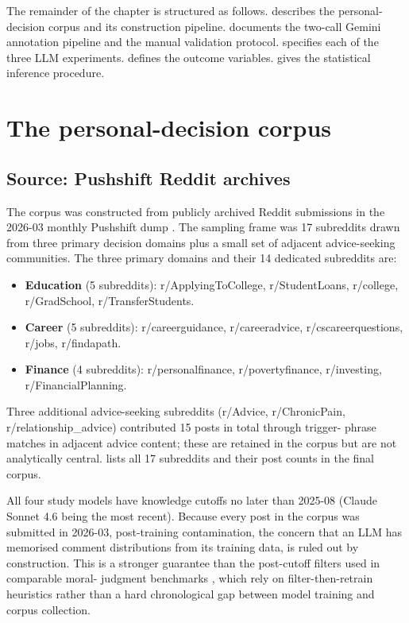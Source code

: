 The remainder of the chapter is structured as follows.
 describes the personal-decision corpus and its
construction pipeline.  documents the two-call
Gemini annotation pipeline and the manual validation protocol.
 specifies each of the three LLM experiments.
 defines the outcome variables. 
gives the statistical inference procedure.

\section{The personal-decision corpus}
\label{sec:m_corpus}

\subsection{Source: Pushshift Reddit archives}
\label{sec:m_source}

The corpus was constructed from publicly archived Reddit submissions in
the 2026-03 monthly Pushshift dump \citep{baumgartner-2020-pushshift}.
The sampling frame was 17 subreddits drawn from three primary decision
domains plus a small set of adjacent advice-seeking communities. The
three primary domains and their 14 dedicated subreddits are:

\begin{itemize}
\item \textbf{Education} (5 subreddits): r/ApplyingToCollege,
      r/StudentLoans, r/college, r/GradSchool, r/TransferStudents.
\item \textbf{Career} (5 subreddits): r/careerguidance,
      r/careeradvice, r/cscareerquestions, r/jobs, r/findapath.
\item \textbf{Finance} (4 subreddits): r/personalfinance,
      r/povertyfinance, r/investing, r/FinancialPlanning.
\end{itemize}

Three additional advice-seeking subreddits (r/Advice, r/ChronicPain,
r/relationship\_advice) contributed 15 posts in total through trigger-
phrase matches in adjacent advice content; these are retained in the
corpus but are not analytically central.  lists
all 17 subreddits and their post counts in the final corpus.

All four study models have knowledge cutoffs no later than 2025-08
(Claude Sonnet 4.6 being the most recent). Because every post in the
corpus was submitted in 2026-03, post-training contamination, the
concern that an LLM has memorised comment distributions from its
training data, is ruled out by construction. This is a stronger
guarantee than the post-cutoff filters used in comparable moral-
judgment benchmarks \citep{russo-2026-pluralistic}, which rely on
filter-then-retrain heuristics rather than a hard chronological gap
between model training and corpus collection.

